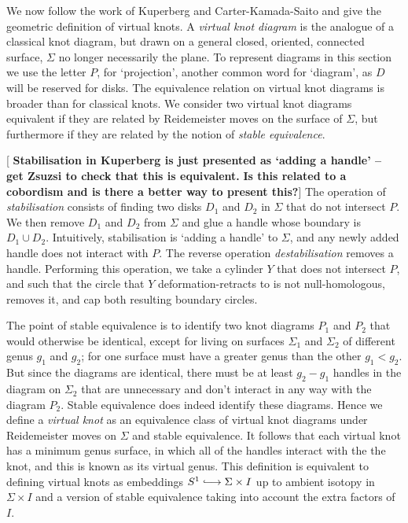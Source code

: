 \documentclass[12pt]{report}
\newcommand{\notered}[1]{{\color{Red} \textbf{#1}}}
\newcommand{\notegreen}[1]{{\color{Green} \textbf{#1}}}
\begin{document}
We now follow the work of Kuperberg \cite{what-is-a-virtual-link} and Carter-Kamada-Saito \cite{stable-equivalence-virtual-cobordisms} and give the geometric definition of virtual knots. A \textit{virtual knot diagram} is the analogue of a classical knot diagram, but drawn on a general closed, oriented, connected surface, $\Sigma$ no longer necessarily the plane. To represent diagrams in this section we use the letter $P$, for `projection', another common word for `diagram', as $D$ will be reserved for disks. The equivalence relation on virtual knot diagrams is broader than for classical knots. We consider two virtual knot diagrams equivalent if they are related by Reidemeister moves on the surface of $\Sigma$, but furthermore if they are related by the notion of \textit{stable equivalence}.

[\notegreen{Stabilisation in Kuperberg is just presented as `adding a handle' -- get Zsuzsi to check that this is equivalent.} \notered{Is this related to a cobordism and is there a better way to present this?}] The operation of \textit{stabilisation} consists of finding two disks $D_{1}$ and $D_{2}$ in $\Sigma$ that do not intersect $P$. We then remove $D_{1}$ and $D_{2}$ from $\Sigma$ and glue a handle whose boundary is $D_{1} \cup D_{2}$. Intuitively, stabilisation is `adding a handle' to $\Sigma$, and any newly added handle does not interact with $P$. The reverse operation \textit{destabilisation} removes a handle. Performing this operation, we take a cylinder $Y$ that does not intersect $P$, and such that the circle that $Y$ deformation-retracts to is not null-homologous, removes it, and cap both resulting boundary circles.

The point of stable equivalence is to identify two knot diagrams $P_{1}$ and $P_{2}$ that would otherwise be identical, except for living on surfaces $\Sigma_{1}$ and $\Sigma_{2}$ of different genus $g_{1}$ and $g_{2}$; for one surface must have a greater genus than the other $g_{1} < g_{2}$. But since the diagrams are identical, there must be at least $g_{2} - g_{1}$ handles in the diagram on $\Sigma_{2}$ that are unnecessary and don't interact in any way with the diagram $P_{2}$. Stable equivalence does indeed identify these diagrams. Hence we define a \textit{virtual knot} as an equivalence class of virtual knot diagrams under Reidemeister moves on $\Sigma$ and stable equivalence. It follows that each virtual knot has a minimum genus surface, in which all of the handles interact with the the knot, and this is known as its virtual genus. This definition is equivalent to defining virtual knots as embeddings $S^{1} \lhook\joinrel\longrightarrow \Sigma \times I$ up to ambient isotopy in $\Sigma \times I$ and a version of stable equivalence taking into account the extra factors of $I$.
\end{document}
